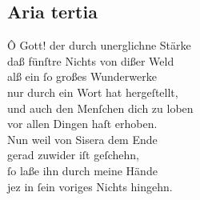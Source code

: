 \documentclass{ees}
\newenvironment{lyrics}[1]{%
  \subsection{#1}\nopagebreak%
  \begin{lyricslist}%
  \let\voice\item%
}{%
  \end{lyricslist}%
}
\begin{document}
\begin{lyrics}{Aria tertia}
  \voice[Jahel]
  Ô Gott! der durch unerglichne Stärke\\
  daß fünſtre Nichts von dißer Weld\\
  alß ein ſo großes Wunderwerke\\
  nur durch ein Wort hat hergeſtellt,\\
  und auch den Menſchen dich zu loben\\
  vor allen Dingen haſt erhoben.\\[1ex]
  Nun weil von Sisera dem Ende\\
  gerad zuwider iſt geſchehn,\\
  ſo laße ihn durch meine Hände\\
  jez in ſein voriges Nichts hingehn.
\end{lyrics}
\end{document}
